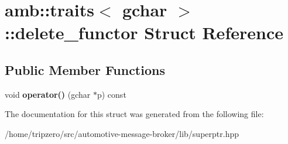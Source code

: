 \hypertarget{structamb_1_1traits_3_01gchar_01_4_1_1delete__functor}{\section{amb\-:\-:traits$<$ gchar $>$\-:\-:delete\-\_\-functor Struct Reference}
\label{structamb_1_1traits_3_01gchar_01_4_1_1delete__functor}
}
\subsection*{Public Member Functions}
\begin{DoxyCompactItemize}
\item 
\hypertarget{structamb_1_1traits_3_01gchar_01_4_1_1delete__functor_a19eabedff810e940a5104aca5785003a}{void {\bfseries operator()} (gchar $\ast$p) const }\label{structamb_1_1traits_3_01gchar_01_4_1_1delete__functor_a19eabedff810e940a5104aca5785003a}

\end{DoxyCompactItemize}


The documentation for this struct was generated from the following file\-:\begin{DoxyCompactItemize}
\item 
/home/tripzero/src/automotive-\/message-\/broker/lib/superptr.\-hpp\end{DoxyCompactItemize}
